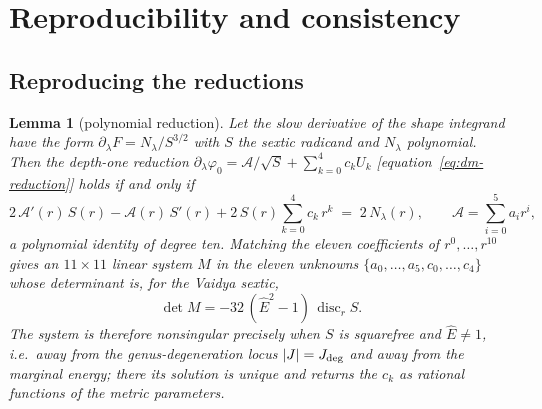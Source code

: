 \documentclass[12pt]{iopart}
\newcommand{\Ehat}{\hat E}
\newcommand{\Jc}{J_{\rm deg}}
\theoremstyle{plain}
\newtheorem{lemma}[theorem]{Lemma}
\theoremstyle{definition}
\theoremstyle{plain}
\theoremstyle{remark}
\newcommand{\Ithm}[1]{\setcounter{theorem}{\numexpr#1-1\relax}}
\begin{document}
\appendix
\section{Reproducibility and consistency}
\label{app:validation}

\subsection{Reproducing the reductions}
\label{app:reproduce}
\Ithm{4}
\begin{lemma}[polynomial reduction]\label{lem:reduction}
Let the slow derivative of the shape integrand have the form
$\partial_\lambda F=N_\lambda/S^{3/2}$ with $S$ the sextic radicand and $N_\lambda$
polynomial. Then the depth-one reduction
$\partial_\lambda\varphi_0=\mathcal{A}/\sqrt S+\sum_{k=0}^4 c_k U_k$
[equation~\eqref{eq:dm-reduction}] holds if and only if
\begin{equation}
    2\,\mathcal{A}'(r)\,S(r)-\mathcal{A}(r)\,S'(r)
    +2\,S(r)\sum_{k=0}^4 c_k\,r^k \;=\; 2\,N_\lambda(r),
    \qquad \mathcal{A}=\sum_{i=0}^5 a_i r^i,
    \label{eq:reduction-identity}
\end{equation}
a polynomial identity of degree ten. Matching the eleven coefficients of
$r^0,\dots,r^{10}$ gives an $11\times11$ linear system $M$ in the eleven unknowns
$\{a_0,\dots,a_5,c_0,\dots,c_4\}$ whose determinant is, for the Vaidya sextic,
\begin{equation}
    \det M=-32\,(\Ehat^2-1)\,\operatorname{disc}_r S .
    \label{eq:det-disc}
\end{equation}
The system is therefore nonsingular precisely when $S$ is squarefree and $\Ehat\neq1$,
i.e.\ away from the genus-degeneration locus $|J|=\Jc$ and away from the marginal energy;
there its solution is unique and returns the $c_k$ as \emph{rational} functions of the
metric parameters.
\end{lemma}
\end{document}
